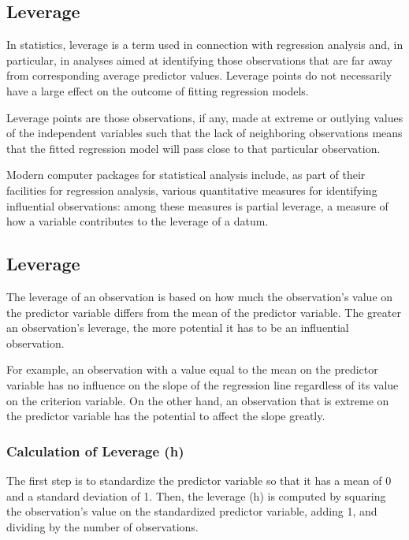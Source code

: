 \documentclass[12pt, a4paper]{article}
\begin{document}

\subsection{Leverage}
In statistics, leverage is a term used in connection with regression analysis and, in particular, in analyses aimed at identifying those observations that are far away from corresponding average predictor values. Leverage points do not necessarily have a large effect on the outcome of fitting regression models.



Leverage points are those observations, if any, made at extreme or outlying values of the independent variables such that the lack of neighboring observations means that the fitted regression model will pass close to that particular observation.

Modern computer packages for statistical analysis include, as part of their facilities for regression analysis, various quantitative measures for identifying influential observations: among these measures is partial leverage, a measure of how a variable contributes to the leverage of a datum.




			\subsection{Leverage}
			The leverage of an observation is based on how much the observation's value on the predictor variable differs from the mean of the predictor variable. The greater an observation's leverage, the more potential it has to be an influential observation. 
			
			For example, an observation with a value equal to the mean on the predictor variable has no influence on the slope of the regression line regardless of its value on the criterion variable. On the other hand, an observation that is extreme on the predictor variable has the potential to affect the slope greatly.
			
			\subsubsection{Calculation of Leverage (h)}
			The first step is to standardize the predictor variable so that it has a mean of 0 and a standard deviation of 1. Then, the leverage (h) is computed by squaring the observation's value on the standardized predictor variable, adding 1, and dividing by the number of observations.
			
\end{document}
